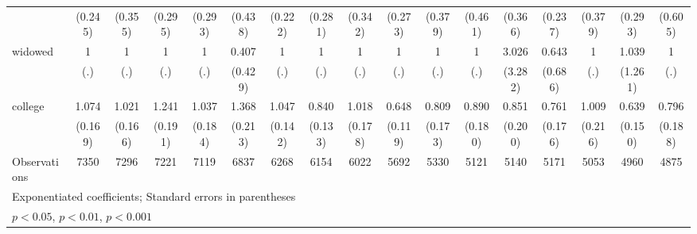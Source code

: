 {\begin{tabular}{l*{16}{c}}
                    &     (0.245)         &     (0.355)         &     (0.295)         &     (0.293)         &     (0.438)         &     (0.222)         &     (0.281)         &     (0.342)         &     (0.273)         &     (0.379)         &     (0.461)         &     (0.366)         &     (0.237)         &     (0.379)         &     (0.293)         &     (0.605)         \\
[1em]
widowed             &           1         &           1         &           1         &           1         &       0.407         &           1         &           1         &           1         &           1         &           1         &           1         &       3.026         &       0.643         &           1         &       1.039         &           1         \\
                    &         (.)         &         (.)         &         (.)         &         (.)         &     (0.429)         &         (.)         &         (.)         &         (.)         &         (.)         &         (.)         &         (.)         &     (3.282)         &     (0.686)         &         (.)         &     (1.261)         &         (.)         \\
[1em]
college             &       1.074         &       1.021         &       1.241         &       1.037         &       1.368\sym{*}  &       1.047         &       0.840         &       1.018         &       0.648\sym{*}  &       0.809         &       0.890         &       0.851         &       0.761         &       1.009         &       0.639         &       0.796         \\
                    &     (0.169)         &     (0.166)         &     (0.191)         &     (0.184)         &     (0.213)         &     (0.142)         &     (0.133)         &     (0.178)         &     (0.119)         &     (0.173)         &     (0.180)         &     (0.200)         &     (0.176)         &     (0.216)         &     (0.150)         &     (0.188)         \\
\hline
Observations        &        7350         &        7296         &        7221         &        7119         &        6837         &        6268         &        6154         &        6022         &        5692         &        5330         &        5121         &        5140         &        5171         &        5053         &        4960         &        4875         \\
\hline\hline
\multicolumn{17}{l}{\footnotesize Exponentiated coefficients; Standard errors in parentheses}\\
\multicolumn{17}{l}{\footnotesize \sym{*} \(p<0.05\), \sym{**} \(p<0.01\), \sym{***} \(p<0.001\)}\\
\end{tabular}
}
